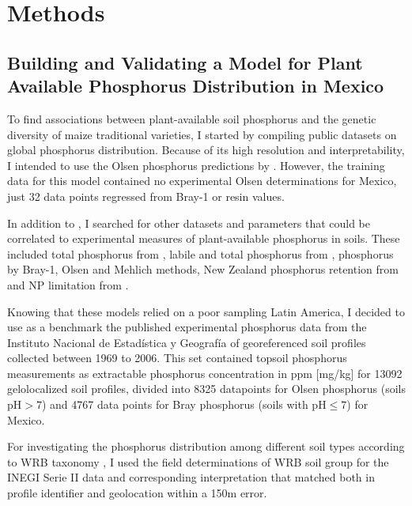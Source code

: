 \section{Methods}
\subsection{Building and Validating a Model for Plant Available Phosphorus Distribution in Mexico}

To find associations between plant-available soil phosphorus and the genetic diversity of maize traditional varieties, I started by compiling public datasets on global phosphorus distribution. 
Because of its high resolution and interpretability, I intended to use the Olsen \citep{olsen1954} phosphorus predictions by \citep{mcdowell2023}.
However, the training data for this model contained no experimental Olsen determinations for Mexico, just 32 data points regressed from Bray-1 or resin values. 

In addition to \citep{mcdowell2023}, I searched for other datasets and parameters that could be correlated to experimental measures of plant-available phosphorus in soils. These included total phosphorus from \citep{hexianjin2022}, labile and total phosphorus from \citep{yang2013}, phosphorus by Bray-1, Olsen and Mehlich \citep{mehlich1984} methods, New Zealand phosphorus retention from \citep{shangguan2014} and NP limitation from \citep{du2020}.

Knowing that these models relied on a poor sampling Latin America, I decided to use as a benchmark the published experimental phosphorus data from the Instituto Nacional de Estadística y Geografía \citep{paz-pellat2018} of georeferenced soil profiles collected between 1969 to 2006.
This set contained topsoil phosphorus measurements as extractable phosphorus concentration in ppm [mg/kg] for 13092 gelolocalized soil profiles, divided into 8325 datapoints for  Olsen phosphorus (soils $\text{pH} > 7$) and 4767 data points for Bray phosphorus  (soils with $\text{pH} \leq 7$) for Mexico. 

For investigating the phosphorus distribution among different soil types according to WRB taxonomy \citep{wrb2014},  I used the field determinations of WRB soil group for the INEGI Serie II data \citep{inegi2013} and corresponding interpretation \citep{inegi2011,inegi2009} that matched both in profile identifier and geolocation within a 150m error. 

